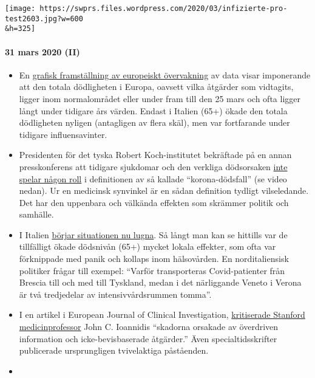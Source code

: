 \texttt{[image: https://swprs.files.wordpress.com/2020/03/infizierte-pro-test2603.jpg?w=600\\\&h=325]}

\hypertarget{31-mars-2020-ii}{%
\paragraph{31 mars 2020 (II)}\label{31-mars-2020-ii}}

\begin{itemize}
\tightlist
\item
  En
  \href{https://off-guardian.org/2020/03/30/covid19-yet-to-impact-europes-overall-mortality/}{grafisk
  framställning av europeiskt övervakning} av data visar imponerande att
  den totala dödligheten i Europa, oavsett vilka åtgärder som vidtagits,
  ligger inom normalområdet eller under fram till den 25 mars och ofta
  ligger långt under tidigare års värden. Endast i Italien (65+) ökade
  den totala dödligheten nyligen (antagligen av flera skäl), men var
  fortfarande under tidigare influensavinter.
\item
  Presidenten för det tyska Robert Koch-institutet bekräftade på en
  annan presskonferens att tidigare sjukdomar och den verkliga
  dödsorsaken
  \href{https://swprs.org/rki-relativiert-corona-todesfaelle/}{inte
  spelar någon roll} i definitionen av så kallade ``korona-dödsfall''
  (se video nedan). Ur en medicinsk synvinkel är en sådan definition
  tydligt vilseledande. Det har den uppenbara och välkända effekten som
  skrämmer politik och samhälle.
\item
  I Italien
  \href{https://www.tagesspiegel.de/politik/die-verlangsamung-ist-da-in-italien-zeichnet-sich-die-wende-in-der-coronakrise-ab/25698124.html}{börjar
  situationen nu lugna}. Så långt man kan se hittills var de tillfälligt
  ökade dödsnivån (65+) mycket lokala effekter, som ofta var förknippade
  med panik och kollaps inom hälsovården. En norditaliensisk politiker
  frågar till exempel: ``Varför transporteras Covid-patienter från
  Brescia till och med till Tyskland, medan i det närliggande Veneto i
  Verona är två tredjedelar av intensivvårdsrummen tomma''.
\item
  I en artikel i European Journal of Clinical Investigation,
  \href{https://onlinelibrary.wiley.com/doi/abs/10.1111/eci.13222}{kritiserade
  Stanford medicinprofessor} John C. Ioannidis ``skadorna orsakade av
  överdriven information och icke-bevisbaserade åtgärder.'' Även
  specialtidsskrifter publicerade ursprungligen tvivelaktiga påståenden.
\item

\end{itemize}
